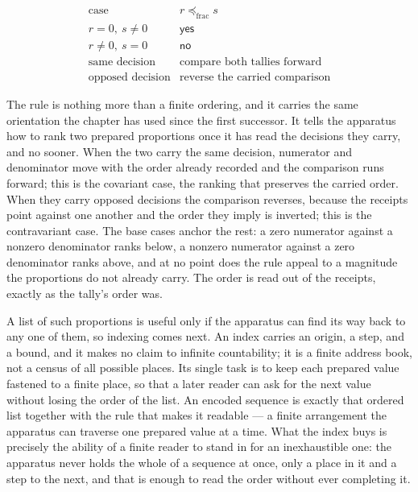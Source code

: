 \[
\begin{array}{c|c}
\text{case} & r \preceq_{\mathrm{frac}} s \\
\hline
r=0,\ s\neq 0 & \mathsf{yes} \\
r\neq 0,\ s=0 & \mathsf{no} \\
\text{same decision} & \text{compare both tallies forward} \\
\text{opposed decision} & \text{reverse the carried comparison}
\end{array}
\]

The rule is nothing more than a finite ordering, and it carries the same orientation the chapter has used since the first successor. It tells the apparatus how to rank two prepared proportions once it has read the decisions they carry, and no sooner. When the two carry the same decision, numerator and denominator move with the order already recorded and the comparison runs forward; this is the covariant case, the ranking that preserves the carried order. When they carry opposed decisions the comparison reverses, because the receipts point against one another and the order they imply is inverted; this is the contravariant case. The base cases anchor the rest: a zero numerator against a nonzero denominator ranks below, a nonzero numerator against a zero denominator ranks above, and at no point does the rule appeal to a magnitude the proportions do not already carry. The order is read out of the receipts, exactly as the tally's order was.

A list of such proportions is useful only if the apparatus can find its way back to any one of them, so indexing comes next. An index carries an origin, a step, and a bound, and it makes no claim to infinite countability; it is a finite address book, not a census of all possible places. Its single task is to keep each prepared value fastened to a finite place, so that a later reader can ask for the next value without losing the order of the list. An encoded sequence is exactly that ordered list together with the rule that makes it readable --- a finite arrangement the apparatus can traverse one prepared value at a time. What the index buys is precisely the ability of a finite reader to stand in for an inexhaustible one: the apparatus never holds the whole of a sequence at once, only a place in it and a step to the next, and that is enough to read the order without ever completing it.


